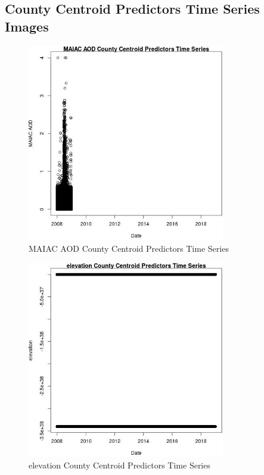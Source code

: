 
\subsection{County Centroid Predictors Time Series Images} 
 

\begin{figure} 
\centering  
\includegraphics[width=0.77\textwidth]{Code_Outputs/df_report_ML_predictors_CountyCentroid_Locations_Dates_2008-01-01to2018-12-31_MAIAC_AODvDate.jpg} 
\caption{\label{fig:df_report_ML_predictors_CountyCentroid_Locations_Dates_2008-01-01to2018-12-31MAIAC_AODvDate}MAIAC AOD County Centroid Predictors Time Series} 
\end{figure} 
 

\begin{figure} 
\centering  
\includegraphics[width=0.77\textwidth]{Code_Outputs/df_report_ML_predictors_CountyCentroid_Locations_Dates_2008-01-01to2018-12-31_elevationvDate.jpg} 
\caption{\label{fig:df_report_ML_predictors_CountyCentroid_Locations_Dates_2008-01-01to2018-12-31elevationvDate}elevation County Centroid Predictors Time Series} 
\end{figure} 
 

